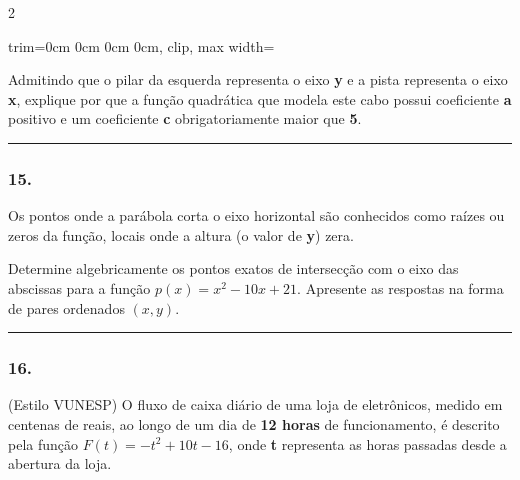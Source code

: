 \documentclass[twoside, 10pt, a4paper]{article}
\newlength{\espacoPreQuestao}
\newlength{\espacoQuestao}
\newlength{\larguraTikz}
\begin{document}
\begin{multicols*}{2}
\begin{center}
\begin{adjustbox}{trim=0cm 0cm 0cm 0cm, clip, max width=\larguraTikz}
\end{adjustbox}
\end{center}

Admitindo que o pilar da esquerda representa o eixo \textbf{y} e a pista representa o eixo \textbf{x}, explique por que a função quadrática que modela este cabo possui coeficiente \textbf{a} positivo e um coeficiente \textbf{c} obrigatoriamente maior que \textbf{5}.
\par\vspace{\espacoQuestao}

\noindent\textcolor{CorLinha}{\rule{\linewidth}{0.5pt}} 
\par\vspace{\espacoPreQuestao}
\subsubsection*{15.} Os pontos onde a parábola corta o eixo horizontal são conhecidos como raízes ou zeros da função, locais onde a altura (o valor de \textbf{y}) zera.

Determine algebricamente os pontos exatos de intersecção com o eixo das abscissas para a função $p(x) = x^2 - 10x + 21$. Apresente as respostas na forma de pares ordenados $(x, y)$.
\par\vspace{\espacoQuestao}

\noindent\textcolor{CorLinha}{\rule{\linewidth}{0.5pt}} 
\par\vspace{\espacoPreQuestao}
\subsubsection*{16.} (Estilo VUNESP) O fluxo de caixa diário de uma loja de eletrônicos, medido em centenas de reais, ao longo de um dia de \textbf{12 horas} de funcionamento, é descrito pela função $F(t) = -t^2 + 10t - 16$, onde \textbf{t} representa as horas passadas desde a abertura da loja.


\end{multicols*}
\end{document}
